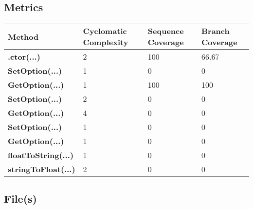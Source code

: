\documentclass[a4paper,10pt]{article}
\begin{document}
\subsection{Metrics}
\begin{longtable}[l]{|l|l|l|l|}
\hline
\textbf{Method} & \textbf{Cyclomatic Complexity} & \textbf{Sequence Coverage} & \textbf{Branch Coverage}\\
\hline
\textbf{.ctor(...)} & 2 & 100 & 66.67\\
\hline
\textbf{SetOption(...)} & 1 & 0 & 0\\
\hline
\textbf{GetOption(...)} & 1 & 100 & 100\\
\hline
\textbf{SetOption(...)} & 2 & 0 & 0\\
\hline
\textbf{GetOption(...)} & 4 & 0 & 0\\
\hline
\textbf{SetOption(...)} & 1 & 0 & 0\\
\hline
\textbf{GetOption(...)} & 1 & 0 & 0\\
\hline
\textbf{floatToString(...)} & 1 & 0 & 0\\
\hline
\textbf{stringToFloat(...)} & 2 & 0 & 0\\
\hline
\end{longtable}
\subsection{File(s)}
\end{document}
